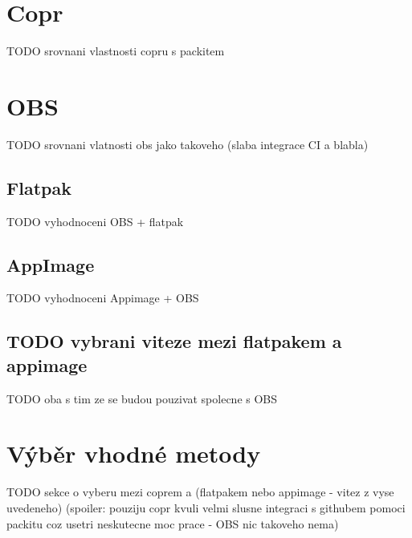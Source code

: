 \documentclass[
  digital,     %
  oneside,     %
  nosansbold,  %
  nocolorbold, %
  lof,         %
  lot,         %
]{fithesis4}
\begin{document}

\section{Copr}

TODO srovnani vlastnosti copru s packitem


\section{OBS}

TODO srovnani vlatnosti obs jako takoveho (slaba integrace CI a blabla)


\subsection{Flatpak}

TODO vyhodnoceni OBS + flatpak

\subsection{AppImage}

TODO vyhodnoceni Appimage + OBS

\subsection{TODO vybrani viteze mezi flatpakem a appimage}

TODO oba s tim ze se budou pouzivat spolecne s OBS


\section{Výběr vhodné metody}

TODO sekce o vyberu mezi coprem a (flatpakem nebo appimage - vitez z vyse uvedeneho)
(spoiler: pouziju copr kvuli velmi slusne integraci s githubem pomoci packitu
coz usetri neskutecne moc prace - OBS nic takoveho nema)


\end{document}
